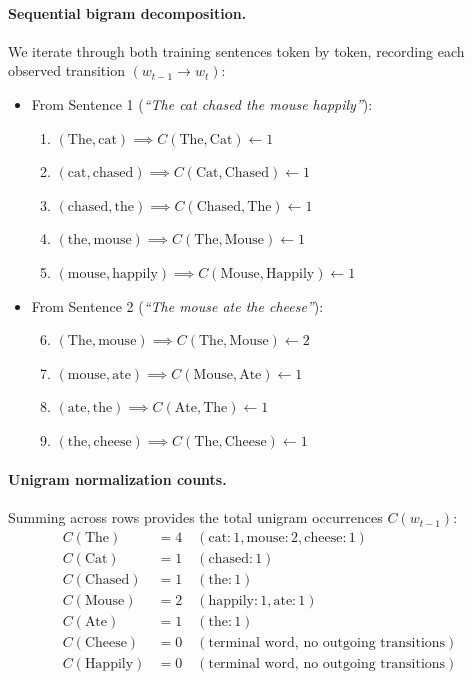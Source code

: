 \documentclass[../../main.tex]{subfiles}
\begin{document}
\paragraph{Sequential bigram decomposition.}
We iterate through both training sentences token by token, recording each observed transition $(w_{t-1} \to w_t)$:
\begin{itemize}
    \item From Sentence 1 (\textit{``The cat chased the mouse happily''}):
    \begin{enumerate}
        \item $(\text{The}, \text{cat}) \implies C(\text{The}, \text{Cat}) \leftarrow 1$
        \item $(\text{cat}, \text{chased}) \implies C(\text{Cat}, \text{Chased}) \leftarrow 1$
        \item $(\text{chased}, \text{the}) \implies C(\text{Chased}, \text{The}) \leftarrow 1$
        \item $(\text{the}, \text{mouse}) \implies C(\text{The}, \text{Mouse}) \leftarrow 1$
        \item $(\text{mouse}, \text{happily}) \implies C(\text{Mouse}, \text{Happily}) \leftarrow 1$
    \end{enumerate}
    \item From Sentence 2 (\textit{``The mouse ate the cheese''}):
    \begin{enumerate}
        \setcounter{enumi}{5}
        \item $(\text{The}, \text{mouse}) \implies C(\text{The}, \text{Mouse}) \leftarrow 2$
        \item $(\text{mouse}, \text{ate}) \implies C(\text{Mouse}, \text{Ate}) \leftarrow 1$
        \item $(\text{ate}, \text{the}) \implies C(\text{Ate}, \text{The}) \leftarrow 1$
        \item $(\text{the}, \text{cheese}) \implies C(\text{The}, \text{Cheese}) \leftarrow 1$
    \end{enumerate}
\end{itemize}

\paragraph{Unigram normalization counts.}
Summing across rows provides the total unigram occurrences $C(w_{t-1})$:
\begin{align*}
C(\text{The}) &= 4 \quad (\text{cat}: 1, \text{mouse}: 2, \text{cheese}: 1) \\
C(\text{Cat}) &= 1 \quad (\text{chased}: 1) \\
C(\text{Chased}) &= 1 \quad (\text{the}: 1) \\
C(\text{Mouse}) &= 2 \quad (\text{happily}: 1, \text{ate}: 1) \\
C(\text{Ate}) &= 1 \quad (\text{the}: 1) \\
C(\text{Cheese}) &= 0 \quad (\text{terminal word, no outgoing transitions}) \\
C(\text{Happily}) &= 0 \quad (\text{terminal word, no outgoing transitions})
\end{align*}
\end{document}
